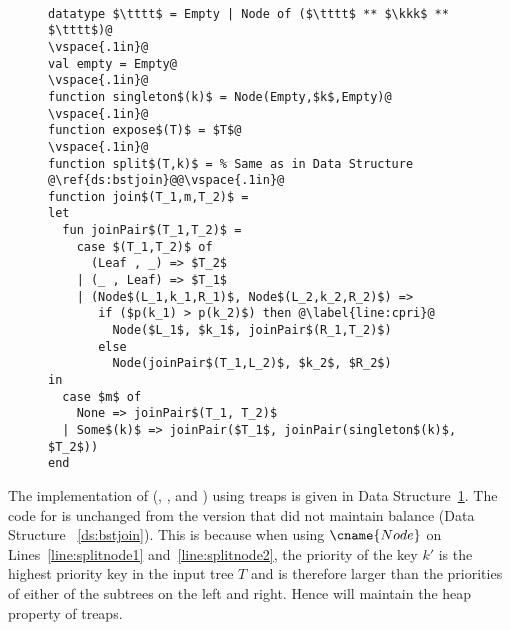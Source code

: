 \begin{figure}
\begin{datastructure}~
\label{ds:treapjoin}
\begin{lstlisting}
datatype $\tttt$ = Empty | Node of ($\tttt$ ** $\kkk$ ** $\tttt$)@
\vspace{.1in}@
val empty = Empty@
\vspace{.1in}@
function singleton$(k)$ = Node(Empty,$k$,Empty)@
\vspace{.1in}@
function expose$(T)$ = $T$@
\vspace{.1in}@
function split$(T,k)$ = % Same as in Data Structure @\ref{ds:bstjoin}@@\vspace{.1in}@
function join$(T_1,m,T_2)$ =
let
  fun joinPair$(T_1,T_2)$ =
    case $(T_1,T_2)$ of
      (Leaf , _) => $T_2$
    | (_ , Leaf) => $T_1$
    | (Node$(L_1,k_1,R_1)$, Node$(L_2,k_2,R_2)$) =>
       if ($p(k_1) > p(k_2)$) then @\label{line:cpri}@
         Node($L_1$, $k_1$, joinPair$(R_1,T_2)$)
       else
         Node(joinPair$(T_1,L_2)$, $k_2$, $R_2$)
in
  case $m$ of
    None => joinPair$(T_1, T_2)$
  | Some$(k)$ => joinPair($T_1$, joinPair(singleton$(k)$, $T_2$))
end
\end{lstlisting}
\end{datastructure}
\end{figure}

The implementation of  (,
,  and ) using treaps is given
in Data Structure~\ref{ds:treapjoin}.  The code for  is
unchanged from the version that did not maintain balance (Data
Structure ~\ref{ds:bstjoin}).  This is because when using
$\cname{Node}$ on Lines~\ref{line:splitnode1}
and~\ref{line:splitnode2}, the priority of the key $k'$ is the highest
priority key in the input tree $T$ and is therefore larger than the
priorities of either of the subtrees on the left and right.  Hence
 will maintain the heap property of treaps.

